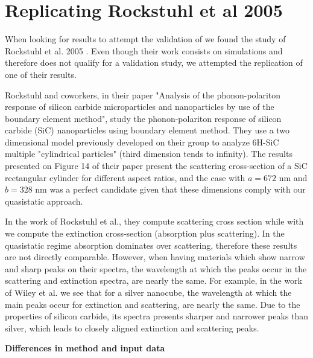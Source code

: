 
\section{Replicating Rockstuhl et al 2005} \label{sec:rep_rockstuhl}
\graphicspath{{replication_validation/figs/}}

When looking for results to attempt the validation of \pygbe we found the study of Rockstuhl et al. 2005 \cite{rockstuhl2005}. 
Even though their work consists on simulations and therefore does not qualify for a validation study, we 
attempted the replication of one of their results. 

Rockstuhl and coworkers, in their paper "Analysis of the phonon-polariton response of silicon carbide microparticles 
and nanoparticles by use of the boundary element method", study the phonon-polariton response of silicon carbide (SiC)
nanoparticles using boundary element method. They use a two dimensional model previously developed on their group \cite{rockstuhl2003}
to analyze 6H-SiC multiple "cylindrical particles" (third dimension tends to infinity). The results presented on Figure 14 of their paper  
present the scattering cross-section of a SiC rectangular cylinder for different aspect ratios, and the case with $a = 672$ nm and $b = 328$ nm
was a perfect candidate given that these dimensions comply with our quasistatic approach.

In the work of Rockstuhl et al., they compute scattering cross section while with \pygbe we compute the extinction cross-section 
(absorption plus scattering). In the quasistatic regime absorption dominates over scattering, therefore these results are not directly
comparable. However, when having materials which show narrow and sharp peaks on their spectra, the wavelength at which the peaks occur 
in the scattering and extinction spectra, are nearly the same. For example, in the work of Wiley et al. \cite{wiley-etal-2006}
we see that for a silver nanocube, the wavelength at which the main peaks occur for extinction and scattering, are nearly the same. Due to the properties 
of silicon carbide, its spectra presents sharper and narrower peaks than silver, which leads to closely aligned extinction and scattering peaks.

\textbf{Differences in method and input data}

